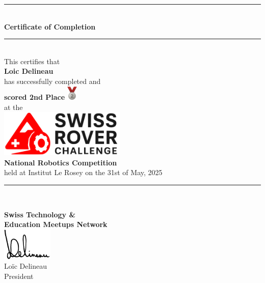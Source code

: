 \documentclass[10pt]{article}
\begin{document}
\begin{center}
	\rule{10cm}{0.4pt} \\
	\vspace{1cm}
	{\LARGE \bfseries Certificate of Completion} \\
	\vspace{0.5cm}
	\rule{10cm}{0.4pt} \\
	\vspace{1.5cm}
	{\large This certifies that} \\
	\vspace{1cm}
	{\Huge \bfseries Loic Delineau} \\
	\vspace{1cm}
	{\large has successfully completed and} \\
	\vspace{0.8cm}
	{\LARGE \bfseries scored 2nd Place}
	\includegraphics[width=0.5cm]{silver.png} \\
	\vspace{1cm}
	{\large at the} \\
	\vspace{1cm}
	\href{https://swissroverchallenge.com}{\includegraphics[width=6cm]{src.png}} \\
	\vspace{1cm}
	{\LARGE \bfseries National Robotics Competition} \\
	\vspace{1cm}
	{\large held at Institut Le Rosey on the 31st of May, 2025} \\
	\vspace{1cm}
	\rule{10cm}{0.4pt} \\
\end{center}

\begin{flushright}
\end{flushright}

\vfill

\begin{center}
	\textbf{Swiss Technology \&} \\
	\textbf{Education Meetups Network} \\
	\vspace{0.3cm}
	\includegraphics[width=2.4cm]{signature-tight.png} \\
	Loïc Delineau \\
	President \\
\end{center}
\end{document}
